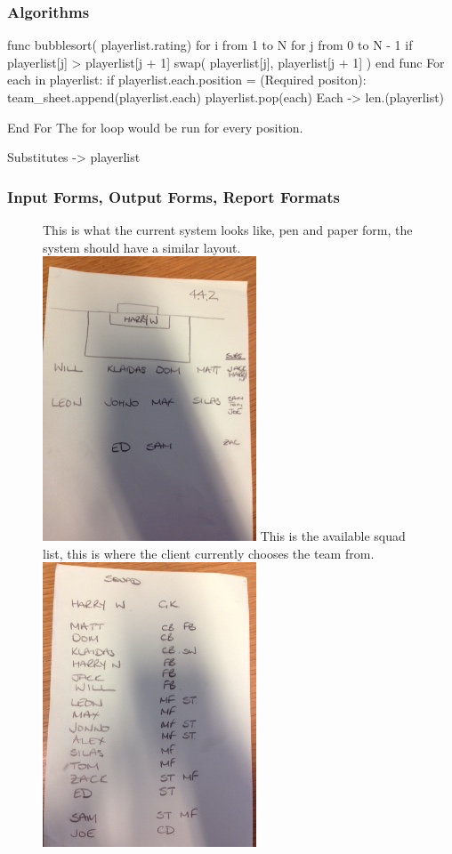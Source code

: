\subsubsection{Algorithms}

func bubblesort( playerlist.rating)
    for i from 1 to N
        for j from 0 to N - 1
           if playerlist[j] > playerlist[j + 1]
              swap( playerlist[j], playerlist[j + 1] )
end func
For each in playerlist:
	if playerlist.each.position = (Required positon):
		team_sheet.append(playerlist.each)
		playerlist.pop(each)
		Each -> len.(playerlist)
		
	
End For
The for loop would be run for every position.

Substitutes ->  playerlist 

\subsubsection{Input Forms, Output Forms, Report Formats}
\begin{figure}[H]
	This is what the current system looks like, pen and paper form, the system should have a similar layout.
	\includegraphics{formation}
	This is the available squad list, this is where the client currently chooses the team from. 
	\includegraphics{squad}
\end{figure}


